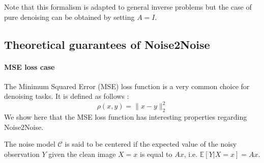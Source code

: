 \begin{remark}
    Note that this formalism is adapted to general inverse problems but the case of pure denoising can be obtained by setting $A = I$.
\end{remark}




\subsection{Theoretical guarantees of Noise2Noise}

\paragraph{MSE loss case}

The Minimum Squared Error (MSE) loss function is a very common choice for denoising tasks. It is defined as follows :
\begin{equation}
    \rho(x, y) = \| x - y \|_2^2    
\end{equation}
\noindent We show here that the MSE loss function has interesting properties regarding Noise2Noise.

\begin{definition}
    The noise model $\mathcal{C}$ is said to be centered if the expected value of the noisy observation $Y$ given the clean image $X=x$ is equal to $Ax$, i.e. $\mathbb{E}[Y | X=x] = Ax$.
\end{definition}

